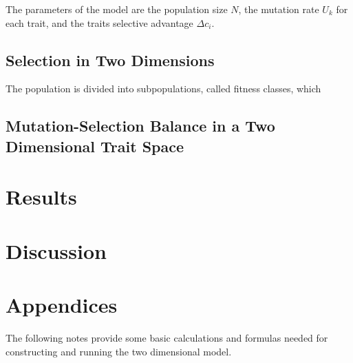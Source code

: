 \documentclass{article}
\begin{document}
The parameters of the model are the population size $N$, the mutation rate $U_k$ for each trait, and the traits selective advantage $\Delta c_i$.  
\subsection*{Selection in Two Dimensions}
The population is divided into subpopulations, called fitness classes, which 
\subsection*{Mutation-Selection Balance in a Two Dimensional Trait Space}

\section*{Results}

\section*{Discussion}

\section*{Appendices}
The following notes provide some basic calculations and formulas needed for constructing and running the two dimensional model.
\end{document}
